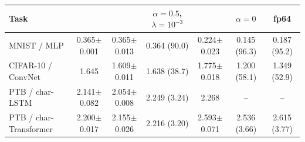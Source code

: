 \begin{tabular}{l ccc ccc}
\toprule
Task & \SPSA{} & \SPSAb{} & \SPSAb{} $\alpha{=}0.5$, $\lambda{=}10^{-3}$ & \ANPb{} & \ANPb{} $\alpha{=}0$ & \ANPb{} fp64 \\
\midrule
MNIST / MLP & 0.365$\pm$0.001 & 0.365$\pm$0.013 & 0.364 (90.0) & 0.224$\pm$0.023 & 0.145 (96.3) & 0.187 (95.2) \\
CIFAR-10 / ConvNet & 1.645 & 1.609$\pm$0.011 & 1.638 (38.7) & 1.775$\pm$0.018 & 1.200 (58.1) & 1.349 (52.9) \\
PTB / char-LSTM & 2.141$\pm$0.082 & 2.054$\pm$0.008 & 2.249 (3.24) & 2.268 & -- & -- \\
PTB / char-Transformer & 2.200$\pm$0.017 & 2.155$\pm$0.026 & 2.216 (3.20) & 2.593$\pm$0.071 & 2.536 (3.66) & 2.615 (3.77) \\
\bottomrule
\end{tabular}
